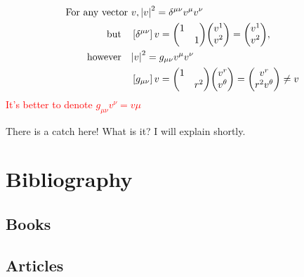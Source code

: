 \documentclass[11pt,fleqn]{book} %
\begin{document}
\begin{align*}
  \text{For any vector\ } & v, \abs{v}^2 = \delta^{\mu\nu} v^\mu v^\nu \\
  \text{but} \quad &\left[ \delta^{\mu\nu} \right] v = \mqty(\dmat{1,1}) \mqty(v^1 \\ v^2) = \mqty(v^1 \\ v^2), \\
  \text{however} \quad & \abs{v}^2 = g_{\mu\nu} v^\mu v^\nu \\
                          & \left[ g_{\mu\nu} \right] v = \mqty(\dmat{1,r^2}) \mqty(v^r \\ v^\theta) = \mqty(v^r \\ r^2 v^\theta) \neq v
\end{align*}
\textcolor{red}{It's better to denote \(g_{\mu\nu} v^\nu = v\mu\)}
\begin{problem}
  There is a catch here! What is it? I will explain shortly.
\end{problem}
\begin{remark}

\end{remark}

\chapter*{Bibliography}
\section*{Books}
\printbibliography[heading=bibempty,type=book]
\section*{Articles}
\printbibliography[heading=bibempty,type=article]


\cleardoublepage
{}
\setlength{\columnsep}{0.75cm}
\printindex

\end{document}
